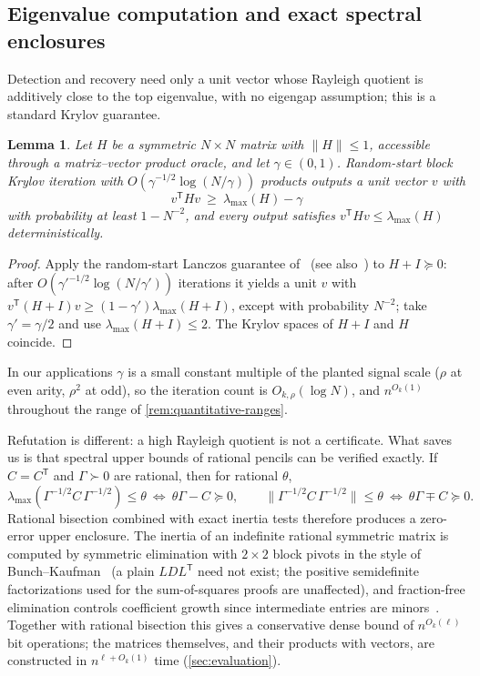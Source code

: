 \documentclass[11pt]{article}
\newtheorem{lemma}[lemma]{Lemma}
\theoremstyle{definition}
\theoremstyle{remark}
\newcommand{\1}{\mathbf 1}
\numberwithin{equation}{section}
\begin{document}
\subsection{Eigenvalue computation and exact spectral enclosures}
\label{sec:solvers}

Detection and recovery need only a unit vector whose Rayleigh quotient
is additively close to the top eigenvalue, with no eigengap assumption;
this is a standard Krylov guarantee.

\begin{lemma}\label{lem:krylov}
Let $H$ be a symmetric $N\times N$ matrix with $\|H\|\le1$, accessible
through a matrix--vector product oracle, and let $\gamma\in(0,1)$.
Random-start block Krylov iteration with
$O(\gamma^{-1/2}\log(N/\gamma))$ products outputs a unit vector $v$ with
\[
 v^{\mathsf T}Hv\ \ge\ \lambda_{\max}(H)-\gamma
\]
with probability at least $1-N^{-2}$, and every output satisfies
$v^{\mathsf T}Hv\le\lambda_{\max}(H)$ deterministically.
\end{lemma}
\begin{proof}
Apply the random-start Lanczos guarantee of~\cite{KW} (see
also~\cite{MuscoMusco}) to $H+I\succeq0$: after
$O(\gamma'^{-1/2}\log(N/\gamma'))$ iterations it yields a unit $v$ with
$v^{\mathsf T}(H+I)v\ge(1-\gamma')\lambda_{\max}(H+I)$, except with
probability $N^{-2}$; take $\gamma'=\gamma/2$ and use
$\lambda_{\max}(H+I)\le2$.  The Krylov spaces of $H+I$ and $H$
coincide.
\end{proof}

In our applications $\gamma$ is a small constant multiple of the
planted signal scale ($\rho$ at even arity, $\rho^2$ at odd), so the
iteration count is $O_{k,\rho}(\log N)$, and $n^{O_k(1)}$ throughout
the range of \cref{rem:quantitative-ranges}.

Refutation is different: a high Rayleigh quotient is not a certificate.
What saves us is that spectral upper bounds of rational pencils can be
verified exactly.  If $C=C^{\mathsf T}$ and $\Gamma\succ0$ are rational,
then for rational $\theta$,
\begin{equation}\label{eq:pencil}
 \lambda_{\max}(\Gamma^{-1/2}C\,\Gamma^{-1/2})\le\theta
 \ \Longleftrightarrow\
 \theta\Gamma-C\succeq0,
 \qquad
 \|\Gamma^{-1/2}C\,\Gamma^{-1/2}\|\le\theta
 \ \Longleftrightarrow\
 \theta\Gamma\mp C\succeq0.
\end{equation}
Rational bisection combined with exact inertia tests therefore produces
a zero-error upper enclosure.  The inertia of an indefinite rational
symmetric matrix is computed by symmetric elimination with $2\times2$
block pivots in the style of Bunch--Kaufman~\cite{BunchKaufman} (a
plain $LDL^{\mathsf T}$ need not exist; the positive semidefinite
factorizations used for the sum-of-squares proofs are unaffected), and
fraction-free elimination controls coefficient growth since
intermediate entries are minors~\cite{Bareiss}.  Together with rational
bisection this gives a conservative dense bound of $n^{O_k(\ell)}$ bit
operations; the matrices themselves, and their products with vectors,
are constructed in $n^{\ell+O_k(1)}$ time (\cref{sec:evaluation}).
\end{document}
